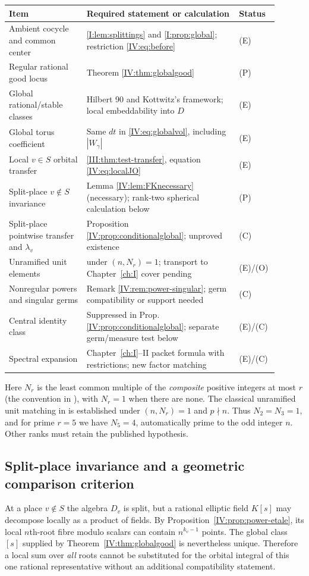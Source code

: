 \begin{center}\small
\begin{longtable}{@{}p{0.27\linewidth}p{0.53\linewidth}p{0.10\linewidth}@{}}
\toprule
Item & Required statement or calculation & Status\\\midrule
\endhead
Ambient cocycle and common center & \cref{I:lem:splittings} and \cref{I:prop:global}; restriction \eqref{IV:eq:before} & (E)\\
Regular rational good locus & Theorem \ref{IV:thm:globalgood} & (P)\\
Global rational/stable classes & Hilbert 90 and Kottwitz's framework; local embeddability into $D$ & (E)\\
Global torus coefficient & Same $dt$ in \eqref{IV:eq:globalvol}, including $|W_\gamma|$ & (E)\\
Local $v\in S$ orbital transfer & \cref{III:thm:test-transfer}, equation \eqref{IV:eq:localJO} & (E)\\
Split-place $v\notin S$ invariance & Lemma \ref{IV:lem:FKnecessary} (necessary); rank-two spherical calculation below & (P)\\
Split-place pointwise transfer and $\lambda_v$ & Proposition \ref{IV:prop:conditionalglobal}; unproved existence & (C)\\
Unramified unit elements & \cite[\S\S11--12]{FK86} under $(n,N_r)=1$; transport to Chapter~\ref{ch:I} cover pending & (E)/(O)\\
Nonregular powers and singular germs & Remark \ref{IV:rem:power-singular}; germ compatibility or support needed & (C)\\
Central identity class & Suppressed in Prop. \ref{IV:prop:conditionalglobal}; separate germ/measure test below & (E)/(C)\\
Spectral expansion & Chapter~\ref{ch:I}--II packet formula with restrictions; new factor matching & (E)/(C)\\
\bottomrule
\end{longtable}
\end{center}
Here $N_r$ is the least common multiple of the \emph{composite}
positive integers at most $r$ (the convention in \cite{FK86}), with $N_r=1$
when there are none.  The classical unramified unit matching in
\cite[\S12, Corollary]{FK86} is established under $(n,N_r)=1$
and $p\nmid n$.  Thus $N_2=N_3=1$, and for prime $r=5$
we have $N_5=4$, automatically prime to the odd integer $n$.
Other ranks must retain the published hypothesis.

\subsection{Split-place invariance and a geometric comparison criterion}
At a place $v\notin S$ the algebra $D_v$ is split, but a rational
elliptic field $K[s]$ may decompose locally as a product of fields.
By Proposition~\ref{IV:prop:power-etale}, its local $n$th-root fibre
modulo scalars can contain $n^{k_v-1}$ points.  The global class
$[s]$ supplied by Theorem~\ref{IV:thm:globalgood} is nevertheless
unique.  Therefore a local sum over \emph{all} roots cannot be substituted
for the orbital integral of this one rational representative without
an additional compatibility statement.

